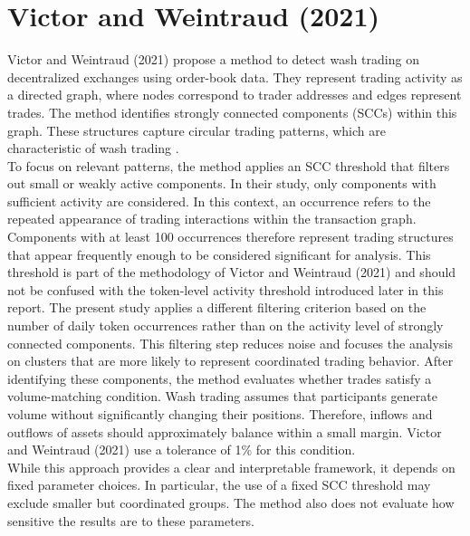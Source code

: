 \documentclass[language=english,thesis=bachelor,nosecondtitle,faculty=cb,onesided,13pt]{hsmw-thesis}
\begin{document}
	\section{Victor and Weintraud (2021)}
Victor and Weintraud (2021) propose a method to detect wash trading on decentralized exchanges using order-book data. They represent trading activity as a directed graph, where nodes correspond to trader addresses and edges represent trades.
The method identifies strongly connected components (SCCs) within this graph. These structures capture circular trading patterns, which are characteristic of wash trading \cite{victor2021detecting}.\\
To focus on relevant patterns, the method applies an SCC threshold that filters out small or weakly active components. In their study, only components with sufficient activity are considered. In this context, an occurrence refers to the repeated appearance of trading interactions within the transaction graph. Components with at least 100 occurrences therefore represent trading structures that appear frequently enough to be considered significant for analysis. This threshold is part of the methodology of Victor and Weintraud (2021) and should not be confused with the token-level activity threshold introduced later in this report. The present study applies a different filtering criterion based on the number of daily token occurrences rather than on the activity level of strongly connected components. This filtering step reduces noise and focuses the analysis on clusters that are more likely to represent coordinated trading behavior.
After identifying these components, the method evaluates whether trades satisfy a volume-matching condition. Wash trading assumes that participants generate volume without significantly changing their positions. Therefore, inflows and outflows of assets should approximately balance within a small margin. Victor and Weintraud (2021) use a tolerance of 1\% for this condition.\\
While this approach provides a clear and interpretable framework, it depends on fixed parameter choices. In particular, the use of a fixed SCC threshold may exclude smaller but coordinated groups. The method also does not evaluate how sensitive the results are to these parameters.
\end{document}
